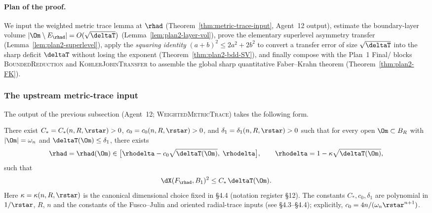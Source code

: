 \paragraph{Plan of the proof.}
We input the weighted metric trace lemma at $\rhad$
(Theorem~\ref{thm:metric-trace-input}, Agent~12 output), estimate the
boundary-layer volume $|\Om\setminus E_{\rhad}|=O(\sqrt{\deltaT})$
(Lemma~\ref{lem:plan2-layer-vol}), prove the elementary superlevel
asymmetry transfer (Lemma~\ref{lem:plan2-superlevel}), apply the
\emph{squaring identity} $(a+b)^2\le 2a^2+2b^2$ to convert a transfer
error of size $\sqrt{\deltaT}$ into the sharp deficit
$\deltaT$ without losing the exponent (Theorem~\ref{thm:plan2-bdd-SV}),
and finally compose with the Plan~1 Final/ blocks
\textsc{BoundedReduction} and \textsc{KohlerJobinTransfer} to assemble
the global sharp quantitative Faber--Krahn theorem
(Theorem~\ref{thm:plan2-FK}).

\subsubsection{The upstream metric-trace input}
\label{sssec:plan2-metric-trace-input}

The output of the previous subsection (Agent~12;
\textsc{WeightedMetricTrace}) takes the following form.

\begin{theorem}
\label{thm:metric-trace-input}
There exist
$C_*=C_*(n,R,\rstar)>0$, $c_0=c_0(n,R,\rstar)>0$, and
$\delta_1=\delta_1(n,R,\rstar)>0$ such that for every open
$\Om\subset B_R$ with $|\Om|=\omega_n$ and $\deltaT(\Om)\le\delta_1$,
there exists
\begin{equation}\label{eq:plan2-rhad-window}
   \rhad=\rhad(\Om)\in
   \bigl[\rhodelta-c_0\sqrt{\deltaT(\Om)},\;\rhodelta\bigr],
   \qquad \rhodelta=1-\kappa\sqrt{\deltaT(\Om)},
\end{equation}
such that
\begin{equation}\label{eq:plan2-metric-trace}
   \dX(F_{\rhad},B_1)^{2}\le C_*\,\deltaT(\Om).
\end{equation}
Here $\kappa=\kappa(n,R,\rstar)$ is the canonical dimensional choice
fixed in \S4.4 (notation register \S12). The constants $C_*,c_0,\delta_1$
are polynomial in $1/\rstar$, $R$, $n$ and the constants of the
Fusco--Julin and oriented radial-trace inputs
(see \S4.3--\S4.4); explicitly, $c_0=4n/(\omega_n\rstar^{n+1})$.
\end{theorem}

